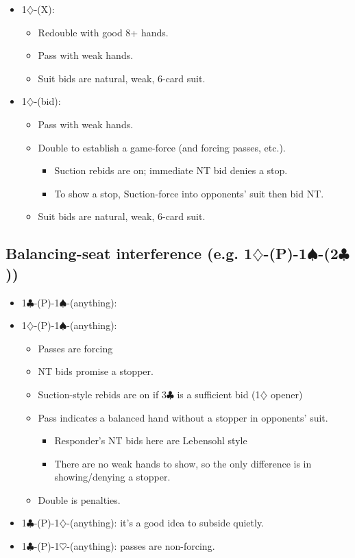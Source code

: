 \documentclass[a4paper,12pt]{article}
\begin{document}
\begin{itemize}
\item 1$\diamondsuit$-(X):
	\begin{itemize}
   \item Redouble with good 8+ hands.
   \item Pass with weak hands.
   \item Suit bids are natural, weak, 6-card suit.
	\end{itemize}
\item 1$\diamondsuit$-(bid):
	\begin{itemize}
   \item Pass with weak hands.
   \item Double to establish a game-force (and forcing passes, etc.).
		\begin{itemize}
      \item Suction rebids are on; immediate NT bid denies a stop.
      \item To show a stop, Suction-force into opponents' suit then bid NT.
		\end{itemize}
   \item Suit bids are natural, weak, 6-card suit.
	\end{itemize}
\end{itemize}

\subsection{Balancing-seat interference (e.g. 1$\diamondsuit$-(P)-1$\spadesuit$-(2$\clubsuit$))}

\begin{itemize}
\item 1$\clubsuit$-(P)-1$\spadesuit$-(anything):
\item 1$\diamondsuit$-(P)-1$\spadesuit$-(anything):
\begin{itemize}
   \item Passes are forcing
   \item NT bids promise a stopper.
   \item Suction-style rebids are on if 3$\clubsuit$ is a sufficient bid (1$\diamondsuit$ opener)
   \item Pass indicates a balanced hand without a stopper in opponents' suit.
	\begin{itemize}
      \item Responder's NT bids here are Lebensohl style
      \item There are no weak hands to show, so the only difference is in showing/denying a stopper.
		\end{itemize}
   \item Double is penalties.
	\end{itemize}

\item 1$\clubsuit$-(P)-1$\diamondsuit$-(anything): it's a good idea to subside quietly.  

\item 1$\clubsuit$-(P)-1$\heartsuit$-(anything): passes are non-forcing. 
\end{itemize}
\end{document}
